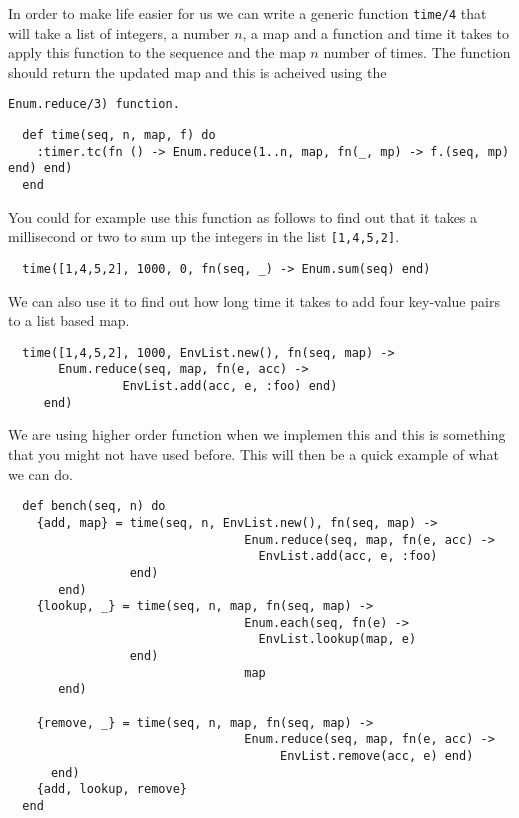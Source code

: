 \documentclass[a4paper,11pt]{article}
\begin{document}
In order to make life easier for us we can write a generic function
{\tt time/4} that will take a list of integers, a number $n$, a map
and a function and time it takes to apply this function to the
sequence and the map $n$ number of times. The function should return
the updated map and this is acheived using the {\tt Enum.reduce/3)
  function.

\begin{verbatim}
  def time(seq, n, map, f) do
    :timer.tc(fn () -> Enum.reduce(1..n, map, fn(_, mp) -> f.(seq, mp) end) end)
  end
\end{verbatim}

You could for example use this function as follows to find out that it
takes a millisecond or two to sum up the integers in the list {\tt [1,4,5,2]}.

\begin{verbatim}
  time([1,4,5,2], 1000, 0, fn(seq, _) -> Enum.sum(seq) end)
\end{verbatim}

We can also use it to find out how long time it takes to add four
key-value pairs to a list based map.

\begin{verbatim}
  time([1,4,5,2], 1000, EnvList.new(), fn(seq, map) -> 
       Enum.reduce(seq, map, fn(e, acc) -> 
                EnvList.add(acc, e, :foo) end) 
     end)
\end{verbatim}

We are using higher order function when we implemen this and this is
something that you might not have used before. This will then be a
quick example of what we can do.

\begin{verbatim}
  def bench(seq, n) do
    {add, map} = time(seq, n, EnvList.new(), fn(seq, map) -> 
                                 Enum.reduce(seq, map, fn(e, acc) -> 
                                   EnvList.add(acc, e, :foo)
				 end)
       end)
    {lookup, _} = time(seq, n, map, fn(seq, map) -> 
                                 Enum.each(seq, fn(e) -> 
                                   EnvList.lookup(map, e)
				 end)
                                 map
       end)

    {remove, _} = time(seq, n, map, fn(seq, map) -> 
                                 Enum.reduce(seq, map, fn(e, acc) -> 
                                      EnvList.remove(acc, e) end) 
      end)
    {add, lookup, remove}
  end
\end{verbatim}

}
\end{document}
